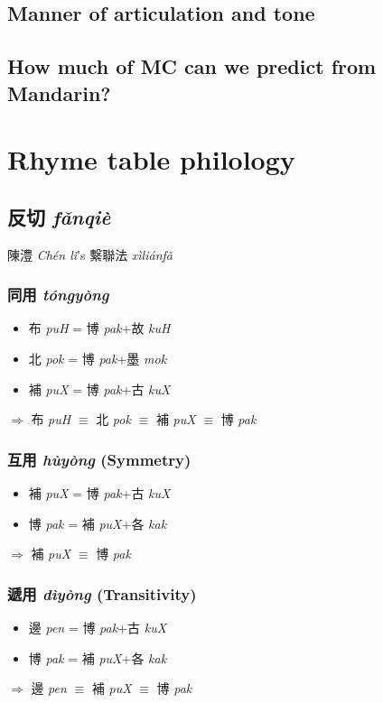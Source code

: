 \documentclass[oneside,a4paper,11pt]{article}
\newcommand{\ipa}[1]{{\phon\textit{#1}}}
\newcommand{\zh}[1]{{\cn #1}}
\newcommand{\zhc}[2]{\zh{#1} \ipa{#2}}
\begin{document}
\subsection{Manner of articulation and tone }

\citet{sagart93gan}
 

\subsection{How much of MC can we predict from Mandarin?}

\section{Rhyme table philology} 

\subsection{\zhc{反切}{fǎnqiè}} \label{sec:fanqie}

\zhc{陳澧}{Chén lǐ}'s \zhc{繫聯法}{xìliánfǎ}

\subsubsection{\zhc{同用}{tóngyòng}}
\begin{itemize}
\item \zhc{布}{puH} = \zhc{博}{pak}+\zhc{故}{kuH}
\item \zhc{北}{pok} = \zhc{博}{pak}+\zhc{墨}{mok}
\item \zhc{補}{puX} = \zhc{博}{pak}+\zhc{古}{kuX}
\end{itemize}
$\Rightarrow$ \zhc{布}{puH} $\equiv$ \zhc{北}{pok} $\equiv$ \zhc{補}{puX} $\equiv$  \zhc{博}{pak}
\subsubsection{\zhc{互用}{hùyòng} (Symmetry)}
\begin{itemize}
\item \zhc{補}{puX} = \zhc{博}{pak}+\zhc{古}{kuX}
\item \zhc{博}{pak} =  \zhc{補}{puX}+\zhc{各}{kak}
\end{itemize}
$\Rightarrow$  \zhc{補}{puX} $\equiv$  \zhc{博}{pak}
\subsubsection{\zhc{遞用}{dìyòng} (Transitivity)}
\begin{itemize}
\item \zhc{邊}{pen} = \zhc{博}{pak}+\zhc{古}{kuX}
\item \zhc{博}{pak} =  \zhc{補}{puX}+\zhc{各}{kak}
\end{itemize}
$\Rightarrow$  \zhc{邊}{pen} $\equiv$ \zhc{補}{puX} $\equiv$  \zhc{博}{pak}
\end{document}
